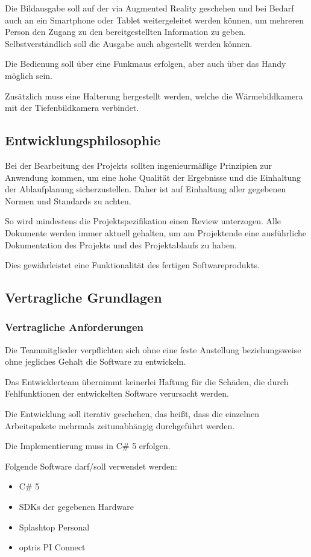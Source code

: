 Die Bildausgabe soll auf der \meta via Augmented Reality geschehen und bei Bedarf auch an ein Smartphone oder Tablet weitergeleitet werden können, um mehreren Person den Zugang zu den bereitgestellten Information zu geben. Selbstverständlich soll die Ausgabe auch abgestellt werden können.

Die Bedienung soll über eine Funkmaus erfolgen, aber auch über das Handy möglich sein.

Zusätzlich muss eine Halterung hergestellt werden, welche die Wärmebildkamera mit der Tiefenbildkamera verbindet.

\subsection{Entwicklungsphilosophie}
Bei der Bearbeitung des Projekts sollten ingenieurmäßige Prinzipien zur Anwendung kommen, um eine hohe Qualität der Ergebnisse und die Einhaltung der Ablaufplanung sicherzustellen.
Daher ist auf Einhaltung aller gegebenen Normen und Standards zu achten.

So wird mindestens die Projektspezifikation einen Review unterzogen.
Alle Dokumente werden immer aktuell gehalten, um am Projektende eine ausführliche Dokumentation des Projekts und des Projektablaufs zu haben.

Dies gewährleistet eine Funktionalität des fertigen Softwareprodukts.

\subsection{Vertragliche Grundlagen}

\subsubsection{Vertragliche Anforderungen}
Die Teammitglieder verpflichten sich ohne eine feste Anstellung beziehungsweise ohne jegliches Gehalt die Software zu entwickeln.

Das Entwicklerteam übernimmt keinerlei Haftung für die Schäden, die durch Fehlfunktionen der entwickelten Software verursacht werden.

Die Entwicklung soll iterativ geschehen, das heißt, dass die einzelnen Arbeitspakete mehrmals zeitunabhängig durchgeführt werden.

Die Implementierung muss in C\# 5 erfolgen.

Folgende Software darf/soll verwendet werden:
\begin{itemize}
	\item C\# 5
	\item SDKs der gegebenen Hardware
	\item Splashtop Personal
	\item optris PI Connect
\end{itemize}

